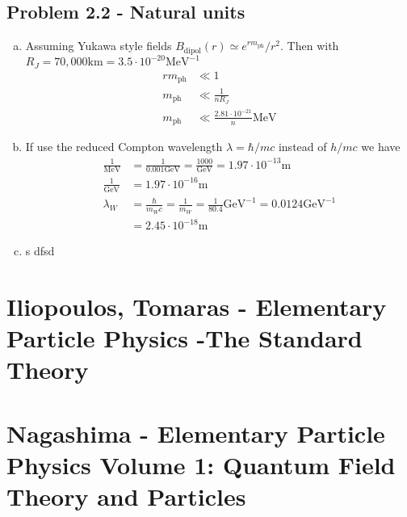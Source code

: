 \documentclass[../main.tex]{subfiles}
\begin{document}
\subsection{Problem 2.2 - Natural units}
\begin{enumerate}[(a)]
\item Assuming Yukawa style fields $B_\text{dipol}(r)\simeq e^{rm_\text{ph}}/r^2$. Then with 
$R_J=70,000\text{km}=3.5\cdot10^{-20}\text{MeV}^{-1}$
\begin{align}
rm_\text{ph}&\ll  1\\
m_\text{ph}&\ll \frac{1}{nR_J}\\
m_\text{ph}&\ll \frac{2.81\cdot 10^{-21}}{n}\text{MeV}
\end{align}

\item If use the reduced Compton wavelength $\lambda=\hbar/mc$ instead of $h/mc$ we have 
\begin{align}
\frac{1}{\text{MeV}}&=\frac{1}{0.001\text{GeV}}=\frac{1000}{\text{GeV}}=1.97\cdot 10^{-13}\text{m}\\
\frac{1}{\text{GeV}}&=1.97\cdot 10^{-16}\text{m}\\
\lambda_W&=\frac{\hbar}{m_Wc}=\frac{1}{m_W}=\frac{1}{80.4}\text{GeV}^{-1}=0.0124\text{GeV}^{-1}\\
&=2.45\cdot10^{-18}\text{m}
\end{align}
\item s dfsd
\end{enumerate}



\section{{\sc Iliopoulos, Tomaras} - Elementary Particle Physics -The Standard Theory}

\section{{\sc Nagashima} - Elementary Particle Physics Volume 1: Quantum Field Theory and Particles}
\end{document}
